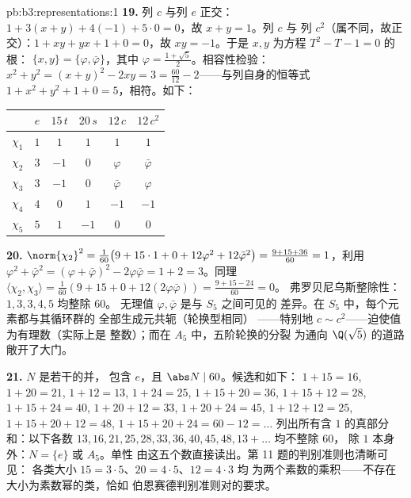\begin{solution}{pb:b3:representations:1}
\textbf{19.} 列 $c$ 与列 $e$ 正交：$1 + 3(x + y) +
4(-1) + 5\cdot0 = 0$，故 $x + y = 1$。列 $c$ 与
列 $c^2$（属不同，故正交）：$1 + xy + yx + 1
+ 0 = 0$，故 $xy = -1$。于是 $x, y$ 为方程 $T^2 - T - 1 = 0$ 的根：
$\{x, y\} = \{\varphi, \bar\varphi\}$，其中 $\varphi = \frac{1 +
\sqrt5}2$。相容性检验：$x^2 + y^2 = (x+y)^2 - 2xy = 3 =
\frac{60}{12} - 2$——与列自身的恒等式 $1 +
x^2 + y^2 + 1 + 0 = 5$，相符。如下：
\begin{center}
\begin{tabular}{c|ccccc}
 & $e$ & $15\,t$ & $20\,s$ & $12\,c$ & $12\,c^2$\\
\hline
$\chi_1$ & $1$ & $1$ & $1$ & $1$ & $1$\\
$\chi_2$ & $3$ & $-1$ & $0$ & $\varphi$ & $\bar\varphi$\\
$\chi_3$ & $3$ & $-1$ & $0$ & $\bar\varphi$ & $\varphi$\\
$\chi_4$ & $4$ & $0$ & $1$ & $-1$ & $-1$\\
$\chi_5$ & $5$ & $1$ & $-1$ & $0$ & $0$\\
\end{tabular}
\end{center}

\textbf{20.} $\norm{\chi_2}^2 = \frac1{60}\bigl(9 + 15\cdot1 +
0 + 12\varphi^2 + 12\bar\varphi^2\bigr) = \frac{9 + 15 +
36}{60} = 1$，利用 $\varphi^2 + \bar\varphi^2 = (\varphi +
\bar\varphi)^2 - 2\varphi\bar\varphi = 1 + 2 = 3$。同理
$\langle\chi_2, \chi_3\rangle = \frac1{60}(9 + 15 + 0 +
12(2\varphi\bar\varphi)) = \frac{9 + 15 - 24}{60} = 0$。
弗罗贝尼乌斯整除性：$1, 3, 3, 4, 5$ 均整除 $60$。
无理值 $\varphi, \bar\varphi$ 是与 $S_5$ 之间可见的
差异。在 $S_5$ 中，每个元素都与其循环群的
全部生成元共轭（轮换型相同）
——特别地 $c \sim c^2$——迫使值为有理数（实际上是
整数）；而在 $A_5$ 中，五阶轮换的分裂
为通向 $\Q(\sqrt5)$ 的道路敞开了大门。

\textbf{21.}  $N$ 是若干的并，
包含 $e$，且 $\abs N \mid 60$。候选和如下：
$1{+}15 = 16$, $1{+}20 = 21$, $1{+}12 = 13$, $1{+}24 = 25$,
$1{+}15{+}20 = 36$, $1{+}15{+}12 = 28$, $1{+}15{+}24 = 40$,
$1{+}20{+}12 = 33$, $1{+}20{+}24 = 45$, $1{+}12{+}12 = 25$,
$1{+}15{+}20{+}12 = 48$, $1{+}15{+}20{+}24 = 60 - 12 = \dots$
列出所有含 $1$ 的真部分和：以下各数 $13, 16,
21, 25, 28, 33, 36, 40, 45, 48, 13{+}\dots$ 均不整除 $60$，
除 $1$ 本身外：$N = \{e\}$ 或 $A_5$。单性
由这五个数直接读出。第 11 题的判别准则也清晰可见：
各类大小 $15 = 3\cdot5$、$20 = 4\cdot5$、$12 = 4\cdot3$ 均
为两个素数的乘积——不存在大小为素数幂的类，恰如
伯恩赛德判别准则对的要求。


\end{solution}
